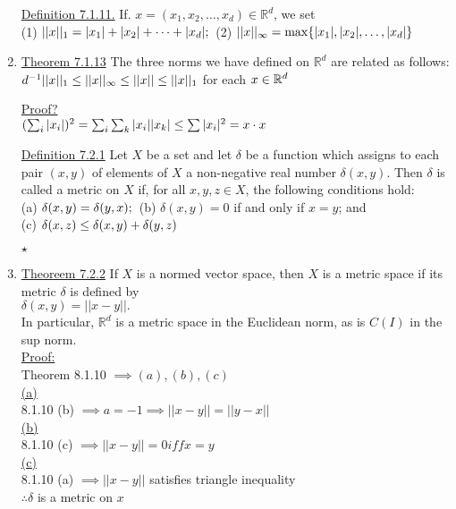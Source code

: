 \documentclass[12pt]{amsart}
\begin{document}
\begin{enumerate}
\hdashrule[0.5ex][c]{\linewidth}{0.5pt}{1.5mm}


\underline{Definition 7.1.11.} If. $x = (x_1, x_2, \dots, x_d) \in \mathbb{R}^d$, we set\\
(1) $|| x ||_1 = |x_1| + |x_2 | + \dots + |x_d|;\\$
(2) $||x||_{\infty} = \max \{ |x_1 |, |x_2 |, \dots , |x_d| \}\\$


\item \underline{Theorem 7.1.13} The three norms we have defined on $\mathbb{R}^d$ are related as follows:\\
$d^{-1} ||x||_1 \leq || x ||_{\infty} \leq ||x|| \leq ||x ||_1\\$
for each $x \in \mathbb{R}^d\\$

\underline{Proof?}\\
$(\sum_i |x_i|)^2 = \sum_i \sum_k |x_i| | x_k | \leq \sum |x_i|^2 = x \cdot x\\$


\hdashrule[0.5ex][c]{\linewidth}{0.5pt}{1.5mm}


\underline{Definition 7.2.1} Let $X$ be a set and let $\delta$ be a function which assigns to each pair $(x,y)$ of elements of $X$ a non-negative real number $\delta(x,y)$. Then $\delta$ is called a metric on $X$ if, for all $x,y,z \in X$, the following conditions hold:\\
(a) $\delta(x,y) = \delta(y,x);\\$
(b) $\delta(x,y) = 0$ if and only if $x=y$; and\\
(c) $\delta (x,z) \leq \delta(x,y) + \delta(y,z)\\$


\hdashrule[0.5ex][c]{\linewidth}{0.5pt}{1.5mm}

$\star$
\item \underline{Theoreem 7.2.2} If $X$ is a normed vector space, then $X$ is a metric space if its metric $\delta$ is defined by\\
$\delta(x,y) = ||x-y||.$\\
In particular, $\mathbb{R}^d$ is a metric space in the Euclidean norm, as is $C (I)$ in the sup norm.\\

\underline{Proof:}\\
Theorem 8.1.10 $\implies (a), (b), (c)$\\
\underline{(a)}\\
8.1.10 (b) $\implies a=-1 \implies ||x-y|| = ||y-x||$\\
\underline{(b)}\\
8.1.10 (c) $\implies || x-y || = 0 iff x=y$\\
\underline{(c)}\\
8.1.10 (a) $\implies ||x-y||$ satisfies triangle inequality\\
$\therefore \delta$ is a metric on $x$\\



\end{enumerate}
\end{document}
